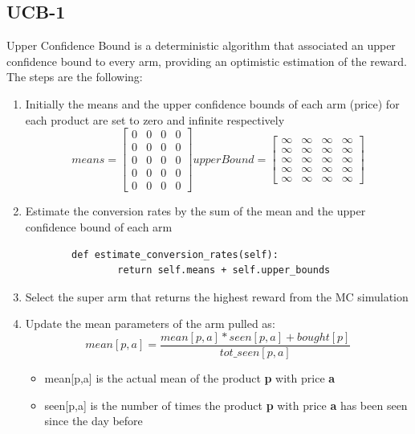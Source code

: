 \subsection{UCB-1}
Upper Confidence Bound is a deterministic algorithm that associated an upper confidence bound to every arm, providing an optimistic estimation of the reward.
The steps are the following:
\begin{enumerate}
    \item Initially the means and the upper confidence bounds of each arm (price) for each product are set to zero and infinite respectively \[ means=
    \begin{bmatrix}
            0 & 0 & 0 & 0\\
            0 & 0 & 0 & 0\\
            0 & 0 & 0 & 0\\
            0 & 0 & 0 & 0\\
            0 & 0 & 0 & 0
    \end{bmatrix}upperBound=
    \begin{bmatrix}
            \infty & \infty & \infty & \infty\\
            \infty & \infty & \infty & \infty\\
            \infty & \infty & \infty & \infty\\
            \infty & \infty & \infty & \infty\\
            \infty & \infty & \infty & \infty
    \end{bmatrix}
    \]
    \item Estimate the conversion rates by the sum of the mean and the upper confidence bound of each arm\begin{verbatim}
        def estimate_conversion_rates(self):
                return self.means + self.upper_bounds
        \end{verbatim}
    \item Select the super arm that returns the highest reward from the MC simulation
    \item Update the mean parameters of the arm pulled as:\begin{equation}
            mean[p,a] = \frac{mean[p,a] * seen[p,a] + bought[p]}{tot\_seen[p,a]}
        \end{equation}
        \begin{itemize}
            \item mean[p,a] is the actual mean of the product {\bf p} with price {\bf a}
            \item seen[p,a] is the number of times the product {\bf p} with price {\bf a} has been seen since the day before

\end{itemize}
\end{enumerate}
